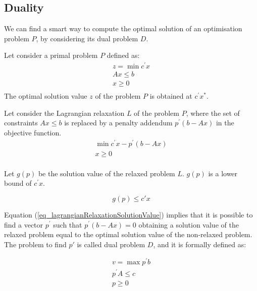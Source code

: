 \subsection{Duality} \label{secDuality}

We can find a smart way to compute the optimal solution of an optimisation problem $P$, by considering its dual problem $D$.\par

Let consider a primal problem $P$ defined as:
\begin{equation}
\begin{split}
    z=\min{c^\prime x}\\
    Ax\le b\\
    x\geq0\\
\end{split}
\label{eq_primalProblem1}
\end{equation}
The optimal solution value $z$ of the problem $P$ is obtained at $c^\prime x^\ast$.\par 

Let consider the Lagrangian relaxation $L$ of the problem $P$, where the set of constraints $Ax\le b$ is replaced by a penalty addendum $p^{\prime}\left(b-Ax\right)$ in the objective function.
\begin{equation}
\begin{split}
    \min{c^\prime x-p^{\prime}(b-Ax)}\\
    x\geq0\\
\end{split}
\label{eq_lagrangianRelaxation}
\end{equation}

Let $g(p)$ be the solution value of the relaxed problem $L$. $g(p)$ is a lower bound of $c^{\prime} x$.

\begin{equation}
g\left(p\right)\le c\prime x
\label{eq_lagrangianRelaxationSolutionValue}
\end{equation}

Equation (\ref{eq_lagrangianRelaxationSolutionValue}) implies that it is possible to find a vector $p^{\prime}$ such that $p^\prime\left(b-Ax\right)=0$ obtaining a solution value of the relaxed problem equal to the optimal solution value of the non-relaxed problem. The problem to find $p\prime$ is called dual problem $D$, and it is formally defined as:

\begin{equation}
\begin{split}
    v=\max{p^\prime b}\\
    p^{\prime} A\le c\\
    p\geq0\\
\end{split}
\label{eq_dualProblem}
\end{equation}


